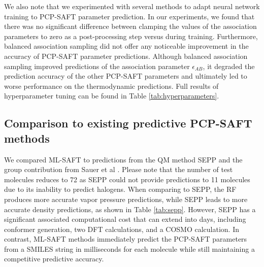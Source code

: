 We also note that we experimented with several methods to adapt neural network training to PCP-SAFT parameter prediction. In our experiments, we found that there was no significant difference between clamping the values of the association parameters to zero as a post-processing step versus during training. Furthermore, balanced association sampling did not offer any noticeable improvement in the accuracy of PCP-SAFT parameter predictions. Although balanced association sampling improved predictions of the association parameter $\epsilon_{AB}$, it degraded the prediction accuracy of the other PCP-SAFT parameters and ultimately led to worse performance on the thermodynamic predictions. Full results of hyperparameter tuning can be found in Table \ref{tab:hyperparameters}.



\subsection{Comparison to existing predictive PCP-SAFT methods}

We compared ML-SAFT to predictions from the QM method SEPP\cite{Kaminski2020} and the group contribution from Sauer et al \cite{Sauer2014}.  Please note that the number of test molecules reduces to 72 as SEPP could not provide predictions to 11 molecules due to its inability to predict halogens. When comparing to SEPP, the RF produces more accurate vapor pressure predictions, while SEPP leads to more accurate density predictions, as shown in Table \ref{tab:sepp}. However, SEPP has a significant associated computational cost that can extend into days, including conformer generation, two DFT calculations, and a COSMO calculation. In contrast, ML-SAFT methods immediately predict the PCP-SAFT parameters from a SMILES string in milliseconds for each molecule while still maintaining a competitive predictive accuracy.  


